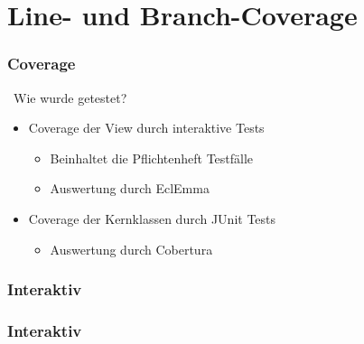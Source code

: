 \documentclass{beamer}
\begin{document}
\section{Line- und Branch-Coverage}
\begin{frame}
  	\frametitle{Coverage}
	\ Wie wurde getestet?
  	\begin{itemize}
		\item Coverage der View durch interaktive Tests
			\begin{itemize}
				\item Beinhaltet die Pflichtenheft Testfälle
				\item Auswertung durch EclEmma
			\end{itemize}
		\item Coverage der Kernklassen durch JUnit Tests
			\begin{itemize}
				\item Auswertung durch Cobertura
			\end{itemize}
	\end{itemize}
\end{frame}
\begin{frame}
  	\frametitle{Interaktiv}
\end{frame}
\begin{frame}
  	\frametitle{Interaktiv}
\end{frame}
\end{document}

